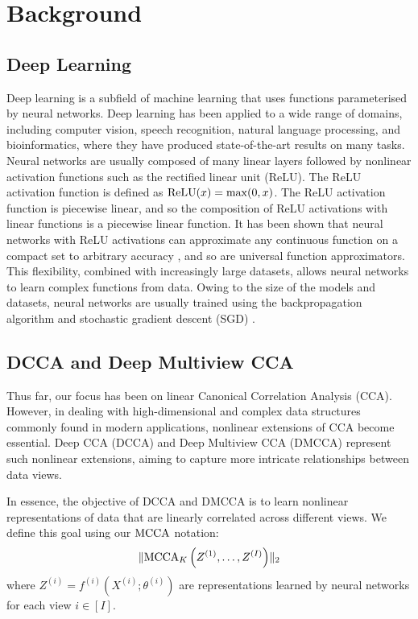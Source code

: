 \section{Background}

\subsection{Deep Learning}

Deep learning is a subfield of machine learning that uses functions parameterised by neural networks.
Deep learning has been applied to a wide range of domains, including computer vision, speech recognition, natural language processing, and bioinformatics, where they have produced state-of-the-art results on many tasks.
Neural networks are usually composed of many linear layers followed by nonlinear activation functions such as the rectified linear unit (ReLU).
The ReLU activation function is defined as $\operatorname{ReLU}(x) = \max(0, x)$.
The ReLU activation function is piecewise linear, and so the composition of ReLU activations with linear functions is a piecewise linear function.
It has been shown that neural networks with ReLU activations can approximate any continuous function on a compact set to arbitrary accuracy \citep{perekrestenko2018universal}, and so are universal function approximators.
This flexibility, combined with increasingly large datasets, allows neural networks to learn complex functions from data.
Owing to the size of the models and datasets, neural networks are usually trained using the backpropagation algorithm and stochastic gradient descent (SGD) \citep{amari1993backpropagation}.



\subsection{DCCA and Deep Multiview CCA}

Thus far, our focus has been on linear Canonical Correlation Analysis (CCA). However, in dealing with high-dimensional and complex data structures commonly found in modern applications, nonlinear extensions of CCA become essential. Deep CCA (DCCA) and Deep Multiview CCA (DMCCA) represent such nonlinear extensions, aiming to capture more intricate relationships between data views.

In essence, the objective of DCCA and DMCCA is to learn nonlinear representations of data that are linearly correlated across different views. We define this goal using our $\operatorname{MCCA}$ notation:
\begin{align}
    \label{eq:DMCCA-def}
    \lVert\operatorname{MCCA}_K\left(Z^{(1)}, \ldots, Z^{(I)}\right)\rVert_2
\end{align}
where $Z^{(i)} = f^{(i)}(X^{(i)}; \theta^{(i)})$ are representations learned by neural networks for each view $i \in [I]$.


